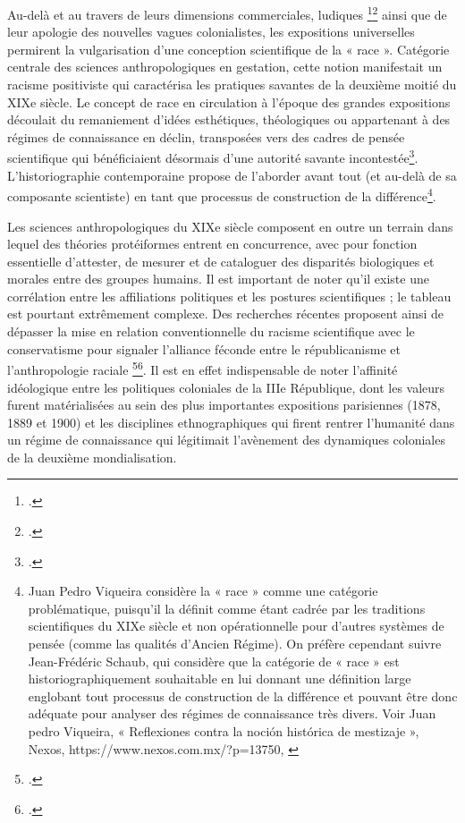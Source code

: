\documentclass{article}
\begin{document}
	Au-delà et au travers de leurs dimensions commerciales, ludiques \footcite{demeulenaere-douyereEntreArcheologieSavante2014}\footcite{hauserEntreSoftPower2015} ainsi que de leur apologie des nouvelles vagues colonialistes, les expositions universelles permirent la vulgarisation d’une conception scientifique de la « race ». Catégorie centrale des sciences anthropologiques en gestation, cette notion manifestait un racisme positiviste qui caractérisa les pratiques savantes de la deuxième moitié du XIXe siècle. Le concept de race en circulation à l’époque des grandes expositions découlait du remaniement d’idées esthétiques, théologiques ou appartenant à des régimes de connaissance en déclin, transposées vers des cadres de pensée scientifique qui bénéficiaient désormais d’une autorité savante incontestée\footcite{blanckaertSpectaclesEthniquesCulture2002}. L’historiographie contemporaine propose de l’aborder avant tout (et au-delà de sa composante scientiste) en tant que processus de construction de la différence\footnote{Juan Pedro Viqueira considère la « race » comme une catégorie problématique, puisqu’il la définit comme étant cadrée par les traditions scientifiques du XIXe siècle et non opérationnelle pour d’autres systèmes de pensée (comme las qualités d’Ancien Régime). On préfère cependant suivre Jean-Frédéric Schaub, qui considère que la catégorie de « race » est historiographiquement souhaitable en lui donnant une définition large englobant tout processus de construction de la différence et pouvant être donc adéquate pour analyser des régimes de connaissance très divers. Voir Juan pedro Viqueira, « Reflexiones contra la noción histórica de mestizaje », Nexos, https://www.nexos.com.mx/?p=13750, \cite{schaubPourHistoirePolitique2015}}.
	
	Les sciences anthropologiques du XIXe siècle composent en outre un terrain dans lequel des théories protéiformes entrent en concurrence, avec pour fonction essentielle d’attester, de mesurer et de cataloguer des disparités biologiques et morales entre des groupes humains. Il est important de noter qu’il existe une corrélation entre les affiliations politiques et les postures scientifiques ; le tableau est pourtant extrêmement complexe. Des recherches récentes proposent ainsi de dépasser la mise en relation conventionnelle du racisme scientifique avec le conservatisme pour signaler l’alliance féconde entre le républicanisme et l’anthropologie raciale \footcite{conklinExposerHumaniteRace2015}\footcite{reynaudpaligotRepubliqueRaciale186019302015}. Il est en effet indispensable de noter l’affinité idéologique entre les politiques coloniales de la IIIe République, dont les valeurs furent matérialisées au sein des plus importantes expositions parisiennes (1878, 1889 et 1900) et les disciplines ethnographiques qui firent rentrer l’humanité dans un régime de connaissance qui légitimait l’avènement des dynamiques coloniales de la deuxième mondialisation.
	
\end{document}
